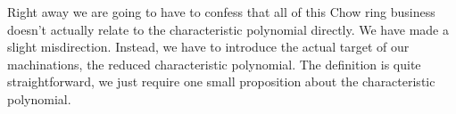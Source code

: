 \documentclass[12pt,oneside]{../../sfsuthesis}
\begin{document}
Right away we are going to have to confess that all of this Chow ring business doesn't actually relate to the characteristic polynomial directly.
We have made a slight misdirection.
Instead, we have to introduce the actual target of our machinations, the reduced characteristic polynomial.
The definition is quite straightforward, we just require one small proposition about the characteristic polynomial.

\end{document}
